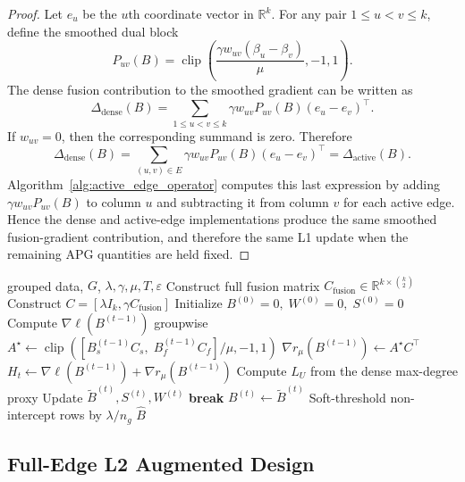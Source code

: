 \documentclass[twoside,11pt]{article}
\newcommand{\R}{\mathbb{R}}
\newcommand{\norm}[1]{\left\lVert #1 \right\rVert}
\DeclareMathOperator{\clip}{clip}
\begin{document}
\begin{proof}
Let $e_u$ be the $u$th coordinate vector in $\R^k$. For any pair
$1\leq u<v\leq k$, define the smoothed dual block
\[
  P_{uv}(B)
  =
  \clip\left(
  \frac{\gamma w_{uv}(\beta_u-\beta_v)}{\mu},-1,1
  \right).
\]
The dense fusion contribution to the smoothed gradient can be written as
\[
  \Delta_{\mathrm{dense}}(B)
  =
  \sum_{1\leq u<v\leq k}
  \gamma w_{uv} P_{uv}(B)(e_u-e_v)^\top .
\]
If $w_{uv}=0$, then the corresponding summand is zero. Therefore
\[
  \Delta_{\mathrm{dense}}(B)
  =
  \sum_{(u,v)\in E}
  \gamma w_{uv} P_{uv}(B)(e_u-e_v)^\top
  =
  \Delta_{\mathrm{active}}(B).
\]
Algorithm~\ref{alg:active_edge_operator} computes this last expression by
adding $\gamma w_{uv}P_{uv}(B)$ to column $u$ and subtracting it from column
$v$ for each active edge. Hence the dense and active-edge implementations
produce the same smoothed fusion-gradient contribution, and therefore the
same L1 update when the remaining APG quantities are held fixed.
\end{proof}

\begin{algorithm}[t]
\caption{Full-Pairwise Smoothed APG Reference (\texttt{old\_l1})}
\label{alg:old_l1}
\begin{algorithmic}[1]
\Require grouped data, $G$, $\lambda,\gamma,\mu,T,\varepsilon$
\State Construct full fusion matrix $C_{\mathrm{fusion}}\in\R^{k\times \binom{k}{2}}$
\State Construct $C=[\lambda I_k,\gamma C_{\mathrm{fusion}}]$
\State Initialize $B^{(0)}=0,\;W^{(0)}=0,\;S^{(0)}=0$
  \State Compute $\nabla \ell(B^{(t-1)})$ groupwise
  \State $A^\star\gets
  \clip\!\left([B_s^{(t-1)}C_s,\;B_f^{(t-1)}C_f]/\mu,-1,1\right)$
  \State $\nabla r_\mu(B^{(t-1)})\gets A^\star C^\top$
  \State $H_t \gets \nabla \ell(B^{(t-1)})+\nabla r_\mu(B^{(t-1)})$
  \State Compute $L_U$ from the dense max-degree proxy
  \State Update $\tilde B^{(t)},S^{(t)},W^{(t)}$
  \If{$\norm{\tilde B^{(t)}-B^{(t-1)}}_1<\varepsilon p$}
    \State \textbf{break}
  \EndIf
  \State $B^{(t)}\gets \tilde B^{(t)}$
\EndFor
\State Soft-threshold non-intercept rows by $\lambda/n_g$
\State \Return $\hat B$
\end{algorithmic}
\end{algorithm}

\subsection{Full-Edge L2 Augmented Design}
\end{document}
